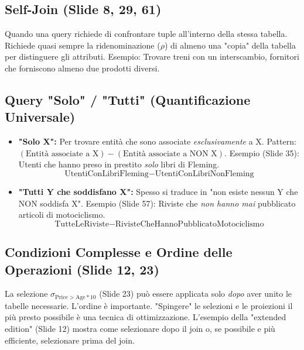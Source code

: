 \subsection{Self-Join (Slide 8, 29, 61)}
Quando una query richiede di confrontare tuple all'interno della stessa tabella. Richiede quasi sempre la ridenominazione ($\rho$) di almeno una "copia" della tabella per distinguere gli attributi. Esempio: Trovare treni con un interscambio, fornitori che forniscono almeno due prodotti diversi.

\subsection{Query "Solo" / "Tutti" (Quantificazione Universale)}
\begin{itemize}
    \item \textbf{"Solo X":} Per trovare entità che sono associate \textit{esclusivamente} a X.
        Pattern: $(\text{Entità associate a X}) - (\text{Entità associate a NON X})$.
        Esempio (Slide 35): Utenti che hanno preso in prestito \textit{solo} libri di Fleming.
        \[ \text{UtentiConLibriFleming} - \text{UtentiConLibriNonFleming} \]
    \item \textbf{"Tutti Y che soddisfano X":} Spesso si traduce in "non esiste nessun Y che NON soddisfa X".
        Esempio (Slide 57): Riviste che \textit{non hanno mai} pubblicato articoli di motociclismo.
        \[ \text{TutteLeRiviste} - \text{RivisteCheHannoPubblicatoMotociclismo} \]
\end{itemize}

\subsection{Condizioni Complesse e Ordine delle Operazioni (Slide 12, 23)}
La selezione $\sigma_{\text{Price} > \text{Age}*10}$ (Slide 23) può essere applicata solo \textit{dopo} aver unito le tabelle necessarie. L'ordine è importante. "Spingere" le selezioni e le proiezioni il più presto possibile è una tecnica di ottimizzazione. L'esempio della "extended edition" (Slide 12) mostra come selezionare dopo il join o, se possibile e più efficiente, selezionare prima del join.

